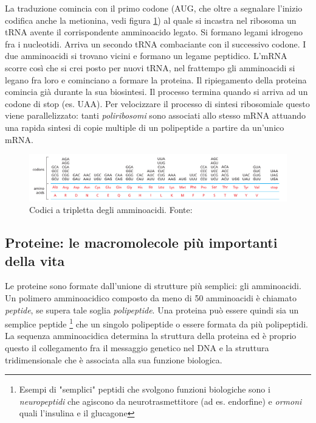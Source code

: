 La traduzione comincia con il primo codone (AUG, che oltre a segnalare l'inizio codifica anche la metionina, vedi figura \ref{fig:codici-amminoacidi}) al quale si incastra nel ribosoma un tRNA avente il corrispondente amminoacido legato. Si formano legami idrogeno fra i nucleotidi. Arriva un secondo tRNA combaciante con il successivo codone. I due amminoacidi si trovano vicini e formano un legame peptidico. L'mRNA scorre così che si crei posto per nuovi tRNA, nel frattempo gli amminoacidi si legano fra loro e cominciano a formare la proteina. Il ripiegamento della proteina comincia già durante la sua biosintesi. Il processo termina quando si arriva ad un codone di stop (es. UAA). Per velocizzare il processo di sintesi ribosomiale questo viene parallelizzato: tanti \textit{poliribosomi} sono associati allo stesso mRNA attuando una rapida sintesi di copie multiple di un polipeptide a partire da un'unico mRNA.

\begin{figure}[h]
	\centering
	\includegraphics[scale=0.46]{images/codici-amminoacidi.png}
	\caption{Codici a tripletta degli amminoacidi. Fonte: \cite{alberts2018essential}}
	\label{fig:codici-amminoacidi}
\end{figure}

\subsection{Proteine: le macromolecole più importanti della vita}

Le proteine sono formate dall'unione di strutture più semplici: gli amminoacidi. Un polimero amminoacidico composto da meno di 50 amminoacidi è chiamato \textit{peptide}, se supera tale soglia \textit{polipeptide}. Una proteina può essere quindi sia un semplice peptide \footnote{Esempi di "semplici" peptidi che svolgono funzioni biologiche sono i \textit{neuropeptidi} che agiscono da neurotrasmettitore (ad es. endorfine) e \textit{ormoni} quali l'insulina e il glucagone} che un singolo polipeptide o essere formata da più polipeptidi. La sequenza amminoacidica determina la struttura della proteina ed è proprio questo il collegamento fra il messaggio genetico nel DNA e la struttura tridimensionale che è associata alla sua funzione biologica. 

